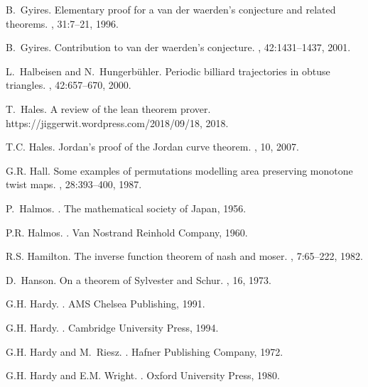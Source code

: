 \documentclass[12pt]{amsart}
\newcounter{example}    \def\example#1{ \item \fontsize{12}{15} \selectfont #1 \fontsize{12}{15} \selectfont }
\begin{document}
\begin{thebibliography}{100}
B.~Gyires.
\newblock Elementary proof for a van der waerden's conjecture and related
  theorems.
, 31:7--21, 1996.

B.~Gyires.
\newblock Contribution to van der waerden's conjecture.
, 42:1431--1437,
  2001.

L.~Halbeisen and N.~Hungerb{\"u}hler.
\newblock Periodic billiard trajectories in obtuse triangles.
, 42:657--670, 2000.

T.~Hales.
\newblock A review of the lean theorem prover.
\newblock https://jiggerwit.wordpress.com/2018/09/18, 2018.

T.C. Hales.
\newblock Jordan's proof of the {J}ordan curve theorem.
, 10, 2007.

G.R. Hall.
\newblock Some examples of permutations modelling area preserving monotone
  twist maps.
, 28:393--400, 1987.

P.~Halmos.
.
\newblock The mathematical society of {Japan}, 1956.

P.R. Halmos.
.
\newblock Van Nostrand Reinhold Company, 1960.

R.S. Hamilton.
\newblock The inverse function theorem of nash and moser.
, 7:65--222, 1982.

D.~Hanson.
\newblock On a theorem of {S}ylvester and {S}chur.
, 16, 1973.

G.H. Hardy.
.
\newblock AMS Chelsea Publishing, 1991.

G.H. Hardy.
.
\newblock Cambridge University Press, 1994.

G.H. Hardy and M.~Riesz.
.
\newblock Hafner Publishing Company, 1972.

G.H. Hardy and E.M. Wright.
.
\newblock Oxford University Press, 1980.


\end{thebibliography}
\end{document}
